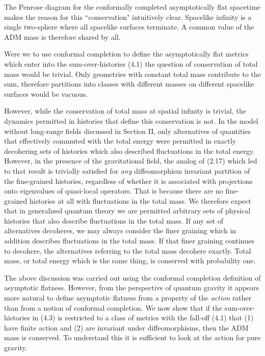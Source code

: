 The Penrose diagram for the conformally completed asymptotically
flat spacetime makes the reason for this ``conservation"
intuitively clear.  Spacelike infinity is a single two-sphere where all
spacelike surfaces terminate.  A common value of the ADM mass is
therefore shared by all.

Were we to use conformal completion to define the
asymptotically flat metrics which enter into
the sum-over-histories (4.1) the question of conservation of total mass
would be trivial.
Only geometries with constant total mass contribute to the sum,
therefore partitions into
classes with different masses on different spacelike surfaces would be vacuous.

However, while the conservation of total mass at spatial infinity
is trivial, the dynamics permitted in histories that define this
conservation is not.  In the model without long-range fields discussed
in Section II, only alternatives of quantities that effectively
commuted with the total energy were permitted in exactly decohering
sets of histories which also described fluctuations in the total
energy.  However, in the presence of the gravitational field, the
analog of (2.17) which led to that result is trivially satisfied
for {\it any} diffeomorphism invariant partition of the fine-grained
histories, regardless of whether it is associated with projections onto
eigenvalues of quasi-local operators.  That is because there are no
fine-grained histories at all with fluctuations in the total mass.
We therefore expect that in generalized quantum theory we are permitted
arbitrary sets of physical histories that also
describe fluctuations in the total
mass.  If
any set of alternatives decoheres, we may always consider the finer
graining which in addition describes fluctuations in the total mass.
If that finer graining continues to decohere, the alternatives
referring to the total mass decohere exactly.  Total mass, or total energy
which is the same thing, is
conserved with probability one.

The above discussion was carried out using the conformal completion
definition of asymptotic flatness.
However, from the perspective of quantum gravity it appears
more natural to define
asymptotic flatness from a property of the {\it action} rather than from
a  notion of conformal
completion.  We now show that if the sum-over-histories in
(4.3) is restricted to a class
of metrics with the fall-off (4.1)
that (1) have finite action and (2) are invariant under
diffeomorphisms, then the ADM mass is conserved.  To understand
this it is sufficient to look at the action for pure gravity.


